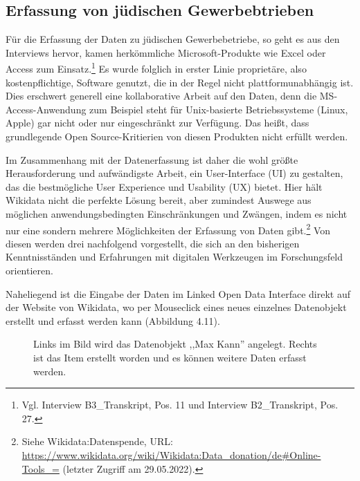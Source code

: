 \subsection{Erfassung von jüdischen Gewerbebtrieben}

Für die Erfassung der Daten zu jüdischen Gewerbebetriebe, so geht es aus den Interviews hervor, kamen herkömmliche Microsoft-Produkte wie Excel oder Access zum Einsatz.\footnote{Vgl. Interview B3\_Transkript, Pos. 11 und Interview B2\_Transkript, Pos. 27.} Es wurde folglich in erster Linie proprietäre, also kostenpflichtige, Software genutzt, die in der Regel nicht plattformunabhängig ist. Dies erschwert generell eine kollaborative Arbeit auf den Daten, denn die MS-Access-Anwendung zum Beispiel steht für Unix-basierte Betriebssysteme (Linux, Apple) gar nicht oder nur eingeschränkt zur Verfügung. Das heißt, dass grundlegende Open Source-Kritierien von diesen Produkten nicht erfüllt werden. 

Im Zusammenhang mit der Datenerfassung ist daher die wohl größte Herausforderung und aufwändigste Arbeit, ein User-Interface (UI) zu gestalten, das die bestmögliche User Experience und Usability (UX) bietet. Hier hält Wikidata nicht die perfekte Lösung bereit, aber zumindest Auswege aus möglichen anwendungsbedingten Einschränkungen und Zwängen, indem es nicht nur eine sondern mehrere Möglichkeiten der Erfassung von Daten gibt.\footnote{Siehe Wikidata:Datenspende, URL: \url{https://www.wikidata.org/wiki/Wikidata:Data\_donation/de\#Online-Tools\_=} (letzter Zugriff am 29.05.2022).} Von diesen werden drei nachfolgend vorgestellt, die sich an den bisherigen Kenntnisständen und Erfahrungen mit digitalen Werkzeugen im Forschungsfeld orientieren. 

Naheliegend ist die Eingabe der Daten im Linked Open Data Interface direkt auf der Website von Wikidata, wo per Mouseclick eines neues einzelnes Datenobjekt erstellt und erfasst werden kann (Abbildung 4.11). 

\begin{figure}[h]
    \centering
    \caption{Links im Bild wird das Datenobjekt ,,Max Kann'' angelegt. Rechts ist das Item erstellt worden und es können weitere Daten erfasst werden.}
    \label{fig:x cubed graph}
\end{figure}

